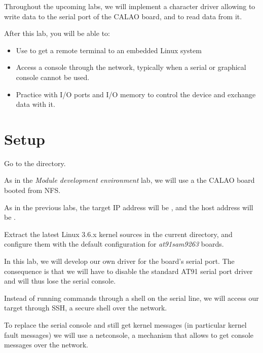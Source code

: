 
Throughout the upcoming labs, we will implement a character driver
allowing to write data to the serial port of the CALAO board, and to
read data from it.

After this lab, you will be able to:

\begin{itemize}

\item Use  to get a remote terminal to an embedded Linux
  system

\item Access a console through the network, typically when a serial or
  graphical console cannot be used.

\item Practice with I/O ports and I/O memory to control the device and
  exchange data with it.

\end{itemize}

\section{Setup}

Go to the  directory.

As in the {\em Module development environment} lab, we will use a the
CALAO board booted from NFS.

As in the previous labs, the target IP address will be ,
and the host address will be .

Extract the latest Linux 3.6.x kernel sources in the current
directory, and configure them with the default configuration for
{\em at91sam9263} boards.

In this lab, we will develop our own driver for the board's serial
port. The consequence is that we will have to disable the standard
AT91 serial port driver and will thus lose the serial console.

Instead of running commands through a shell on the serial line, we
will access our target through SSH, a secure shell over the network.

To replace the serial console and still get kernel messages (in
particular kernel fault messages) we will use a netconsole, a
mechanism that allows to get console messages over the network.

